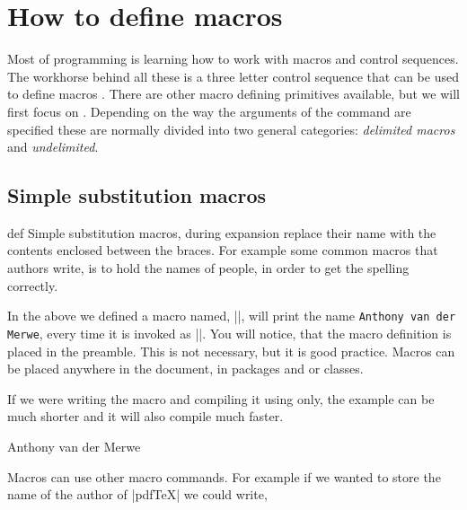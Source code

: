 \section{How to define macros}

Most of \tex programming is learning how to work with macros and control sequences. The workhorse behind all these is a three letter control sequence that can be used to define macros .
There are other macro defining primitives available, but we will first focus on . Depending on the way the arguments of the command are specified these are normally divided into two general categories: \emph{delimited macros} and \emph{undelimited}.
 
\subsection{Simple substitution macros}

\begin{docCommand*}{def} {  }{}
Simple substitution macros, during expansion replace their name with the contents enclosed between the braces. For example some common macros that authors write, is to hold the names of people, in order to get the spelling correctly.
\end{docCommand*}



In the above we defined a macro named, |\myshortcut|, will print the name \texttt{Anthony van der Merwe}, every time it is invoked as |\myshortcut|. You will notice, that the macro definition is placed in the preamble. This is not necessary, but it is good practice. Macros can be placed anywhere in the document, in packages and or classes.


If we were writing the macro and compiling it using \tex only, the example can be much shorter and it will also compile much faster. 

\begin{teX}
\def\myshortcut{Anthony van der Merwe}
\myshortcut
\bye
\end{teX}

Macros can use other macro commands. For example if we wanted to store the name of the author of |pdfTeX| we could write,


